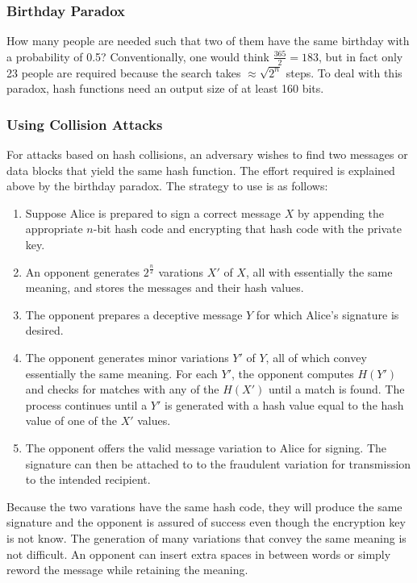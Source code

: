 \documentclass{math}
\begin{document}
\subsubsection*{Birthday Paradox}
How many people are needed such that two of them have the same birthday with a
probability of 0.5? Conventionally, one would think \( \frac{365}{2} = 183 \),
but in fact only 23 people are required because the search takes \( \approx
\sqrt{2^n} \) steps. To deal with this paradox, hash functions need an output
size of at least 160 bits.

\subsubsection*{Using Collision Attacks}
For attacks based on hash collisions, an adversary wishes to find two messages
or data blocks that yield the same hash function. The effort required is
explained above by the birthday paradox. The strategy to use is as follows:
\begin{enumerate}
  \item Suppose Alice is prepared to sign a correct message \( X \) by appending
  the appropriate \( n \)-bit hash code and encrypting that hash code with the
  private key.
  \item An opponent generates \( 2^{\frac{n}{2}} \) varations \( X' \) of
  \( X \), all with essentially the same meaning, and stores the messages and
  their hash values.
  \item The opponent prepares a deceptive message \( Y \) for which Alice's
  signature is desired.
  \item The opponent generates minor variations \( Y' \) of \( Y \), all of
  which convey essentially the same meaning. For each \( Y' \), the opponent
  computes \( H(Y') \) and checks for matches with any of the \( H(X') \) until
  a match is found. The process continues until a \( Y' \) is generated with a
  hash value equal to the hash value of one of the \( X' \) values.
  \item The opponent offers the valid message variation to Alice for signing.
  The signature can then be attached to to the fraudulent variation for
  transmission to the intended recipient.
\end{enumerate}
Because the two varations have the same hash code, they will produce the same
signature and the opponent is assured of success even though the encryption key
is not know. The generation of many variations that convey the same meaning is
not difficult. An opponent can insert extra spaces in between words or simply
reword the message while retaining the meaning.
\end{document}
